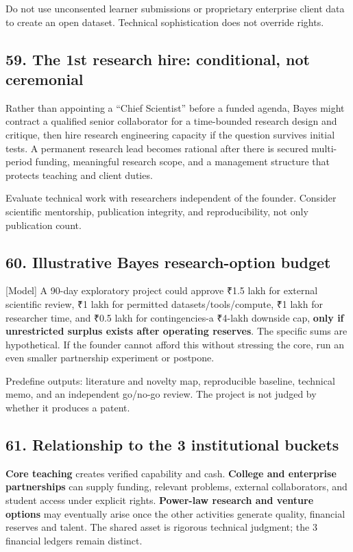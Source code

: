 Do not use unconsented learner submissions or proprietary enterprise client data to create an open dataset. Technical sophistication does not override rights.

\subsection{59. The 1st research hire: conditional, not ceremonial}

Rather than appointing a ``Chief Scientist'' before a funded agenda, Bayes might contract a qualified senior collaborator for a time-bounded research design and critique, then hire research engineering capacity if the question survives initial tests. A permanent research lead becomes rational after there is secured multi-period funding, meaningful research scope, and a management structure that protects teaching and client duties.

Evaluate technical work with researchers independent of the founder. Consider scientific mentorship, publication integrity, and reproducibility, not only publication count.

\subsection{60. Illustrative Bayes research-option budget}

[Model] A 90-day exploratory project could approve ₹1.5 lakh for external scientific review, ₹1 lakh for permitted datasets/tools/compute, ₹1 lakh for researcher time, and ₹0.5 lakh for contingencies-a ₹4-lakh downside cap, \textbf{only if unrestricted surplus exists after operating reserves}. The specific sums are hypothetical. If the founder cannot afford this without stressing the core, run an even smaller partnership experiment or postpone.

Predefine outputs: literature and novelty map, reproducible baseline, technical memo, and an independent go/no-go review. The project is not judged by whether it produces a patent.

\subsection{61. Relationship to the 3 institutional buckets}

\textbf{Core teaching} creates verified capability and cash. \textbf{College and enterprise partnerships} can supply funding, relevant problems, external collaborators, and student access under explicit rights. \textbf{Power-law research and venture options} may eventually arise once the other activities generate quality, financial reserves and talent. The shared asset is rigorous technical judgment; the 3 financial ledgers remain distinct.


